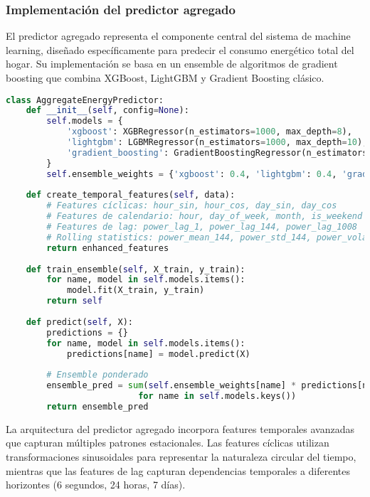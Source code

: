 \subsubsection{Implementación del predictor agregado}

El predictor agregado representa el componente central del sistema de machine learning, diseñado específicamente para predecir el consumo energético total del hogar. Su implementación se basa en un ensemble de algoritmos de gradient boosting que combina XGBoost, LightGBM y Gradient Boosting clásico.

\begin{lstlisting}[language=Python, caption=Estructura principal del predictor agregado]
class AggregateEnergyPredictor:
    def __init__(self, config=None):
        self.models = {
            'xgboost': XGBRegressor(n_estimators=1000, max_depth=8),
            'lightgbm': LGBMRegressor(n_estimators=1000, max_depth=10),
            'gradient_boosting': GradientBoostingRegressor(n_estimators=500)
        }
        self.ensemble_weights = {'xgboost': 0.4, 'lightgbm': 0.4, 'gradient_boosting': 0.2}
    
    def create_temporal_features(self, data):
        # Features cíclicas: hour_sin, hour_cos, day_sin, day_cos
        # Features de calendario: hour, day_of_week, month, is_weekend
        # Features de lag: power_lag_1, power_lag_144, power_lag_1008
        # Rolling statistics: power_mean_144, power_std_144, power_volatility_144
        return enhanced_features
    
    def train_ensemble(self, X_train, y_train):
        for name, model in self.models.items():
            model.fit(X_train, y_train)
        return self
    
    def predict(self, X):
        predictions = {}
        for name, model in self.models.items():
            predictions[name] = model.predict(X)
        
        # Ensemble ponderado
        ensemble_pred = sum(self.ensemble_weights[name] * predictions[name] 
                          for name in self.models.keys())
        return ensemble_pred
\end{lstlisting}

La arquitectura del predictor agregado incorpora features temporales avanzadas que capturan múltiples patrones estacionales. Las features cíclicas utilizan transformaciones sinusoidales para representar la naturaleza circular del tiempo, mientras que las features de lag capturan dependencias temporales a diferentes horizontes (6 segundos, 24 horas, 7 días).

